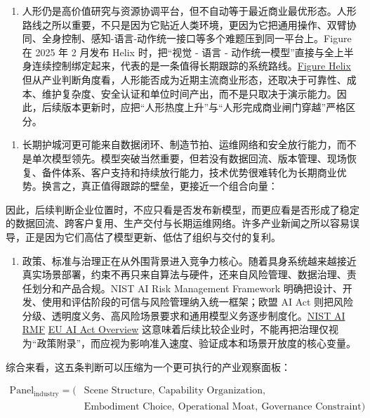 \begin{enumerate}
\item 人形仍是高价值研究与资源协调平台，但不自动等于最近商业最优形态。人形路线之所以重要，不只是因为它贴近人类环境，更因为它把通用操作、双臂协同、全身控制、感知-语言-动作统一接口等多个难题压到同一平台上。Figure 在 2025 年 2 月发布 Helix 时，把“视觉 - 语言 - 动作统一模型”直接与全上半身连续控制绑定起来，代表的是一条值得长期跟踪的系统路线。\href{https://www.figure.ai/news/helix}{Figure Helix} 但从产业判断角度看，人形能否成为近期主流商业形态，还取决于可靠性、成本、维护复杂度、安全认证和单位时间产出，而不是只取决于演示能力。因此，后续版本更新时，应把“人形热度上升”与“人形完成商业闸门穿越”严格区分。
\end{enumerate}

\begin{enumerate}
\item 长期护城河更可能来自数据闭环、制造节拍、运维网络和安全放行能力，而不是单次模型领先。模型突破当然重要，但若没有数据回流、版本管理、现场恢复、备件体系、客户支持和持续放行能力，技术优势很难转化为长期商业优势。换言之，真正值得跟踪的壁垒，更接近一个组合向量：
\end{enumerate}

\texttt{}

因此，后续判断企业位置时，不应只看是否发布新模型，而更应看是否形成了稳定的数据回流、跨客户复用、生产交付与长期运维网络。许多产业新闻之所以容易误导，正是因为它们高估了模型更新、低估了组织与交付的复利。

\begin{enumerate}
\item 政策、标准与治理正在从外围背景进入竞争力核心。随着具身系统越来越接近真实场景部署，约束不再只来自算法与硬件，还来自风险管理、数据治理、责任划分和产品合规。NIST AI Risk Management Framework 明确把设计、开发、使用和评估阶段的可信与风险管理纳入统一框架；欧盟 AI Act 则把风险分级、透明度义务、高风险场景要求和通用模型义务逐步制度化。\href{https://www.nist.gov/itl/ai-risk-management-framework}{NIST AI RMF} \href{https://digital-strategy.ec.europa.eu/en/policies/regulatory-framework-ai}{EU AI Act Overview} 这意味着后续比较企业时，不能再把治理仅视为“政策附录”，而应视为影响准入速度、验证成本和场景开放度的核心变量。
\end{enumerate}

综合来看，这五条判断可以压缩为一个更可执行的产业观察面板：

\begingroup
\scriptsize
\begin{equation*}
\begin{aligned}
\text{Panel}_{\text{industry}} = (&\text{Scene Structure},\ \text{Capability Organization},\\
&\text{Embodiment Choice},\ \text{Operational Moat},\ \text{Governance Constraint})
\end{aligned}
\end{equation*}
\endgroup

